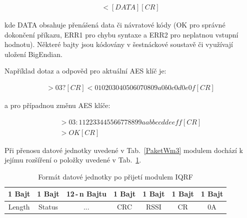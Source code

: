 \begin{eqnarray}
	<[DATA][CR]
\end{eqnarray}

kde DATA obsahuje přenášená data či návratové kódy (OK pro správné dokončení příkazu, ERR1 pro chybu syntaxe a ERR2 pro neplatnou vstupní hodnotu). Některé bajty jsou kódovány v šestnáckové soustavě či využívají uložení BigEndian.

Například dotaz a odpověd pro aktuální AES klíč je:

\begin{eqnarray}
	>03?[CR]
	<010203040506070809a0b0c0d0e0f[CR]
\end{eqnarray}

a pro případnou změnu AES klíče:

\begin{eqnarray}
>03:112233445566778899aabbccddeeff[CR]\\
>OK[CR]
\end{eqnarray}

Při přenosu datové jednotky uvedené v Tab.~\ref{PaketWm3} modulem dochází k jejímu rozšíření o položky uvedené v Tab.~\ref{PaketWm4}.

\begin{table}[!h]
\centering
\begin{tabular}{ccccccc}
1 Bajt & 1 Bajt & 12\,-\,n Bajtu & 1 Bajt & 1 Bajt & 1 Bajt & 1 Bajt\\ \hline
\multicolumn{1}{|c|}{Length} & \multicolumn{1}{c|}{Status} & \multicolumn{1}{c|}{...} & \multicolumn{1}{c|}{CRC} & \multicolumn{1}{c|}{RSSI} & \multicolumn{1}{c|}{CR} & \multicolumn{1}{c|}{0A}\\ \hline
\end{tabular}
\caption{Formát datové jednotky po přijetí modulem IQRF}
\label{PaketWm4}
\end{table}





